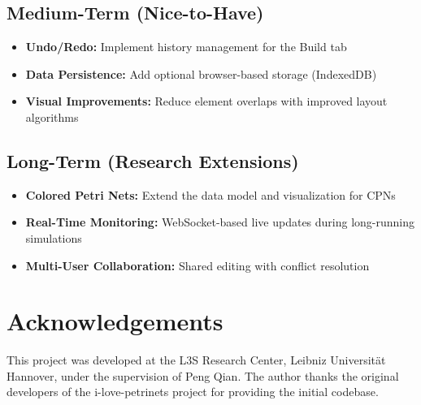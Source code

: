 \subsection{Medium-Term (Nice-to-Have)}

\begin{itemize}
    \item \textbf{Undo/Redo:} Implement history management for the Build tab
    \item \textbf{Data Persistence:} Add optional browser-based storage (IndexedDB)
    \item \textbf{Visual Improvements:} Reduce element overlaps with improved layout algorithms
\end{itemize}

\subsection{Long-Term (Research Extensions)}

\begin{itemize}
    \item \textbf{Colored Petri Nets:} Extend the data model and visualization for CPNs
    \item \textbf{Real-Time Monitoring:} WebSocket-based live updates during long-running simulations
    \item \textbf{Multi-User Collaboration:} Shared editing with conflict resolution
\end{itemize}

\section{Acknowledgements}
\label{sec:acknowledgements}

This project was developed at the L3S Research Center, Leibniz Universität Hannover, under the supervision of Peng Qian. The author thanks the original developers of the i-love-petrinets project for providing the initial codebase.